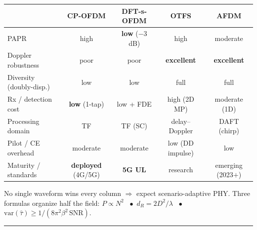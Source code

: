 \documentclass[a4paper,9pt]{extarticle}
\begin{document}
\begin{center}
\renewcommand{\arraystretch}{1.15}
\footnotesize
\begin{tabular}{@{}lcccc@{}}
\toprule
\textbf{} & \textbf{CP-OFDM} & \textbf{DFT-s-OFDM} & \textbf{OTFS} & \textbf{AFDM} \\
\midrule
PAPR                 & high        & \textbf{low} ($-$3 dB) & high        & moderate \\
Doppler robustness   & poor        & poor                   & \textbf{excellent} & \textbf{excellent} \\
Diversity (doubly-disp.) & low     & low                    & full        & full \\
Rx / detection cost  & \textbf{low} (1-tap) & low + FDE       & high (2D MP) & moderate (1D) \\
Processing domain    & TF          & TF (SC)                & delay--Doppler & DAFT (chirp) \\
Pilot / CE overhead  & moderate    & moderate               & low (DD impulse) & low \\
Maturity / standards & \textbf{deployed} (4G/5G) & \textbf{5G UL} & research     & emerging (2023$+$) \\
\bottomrule
\end{tabular}
\end{center}
\vspace{1pt}
{\footnotesize No single waveform wins every column $\Rightarrow$ expect
scenario-adaptive PHY. Three formulas organize half the field:\;
$P\!\propto\!N^{2}$ \ $\bullet$\ $d_R=2D^{2}/\lambda$ \ $\bullet$\
$\mathrm{var}(\hat\tau)\ge 1/(8\pi^{2}\beta^{2}\,\mathrm{SNR})$.}

\vspace{3pt}
\hrule
\vspace{3pt}
\end{document}
